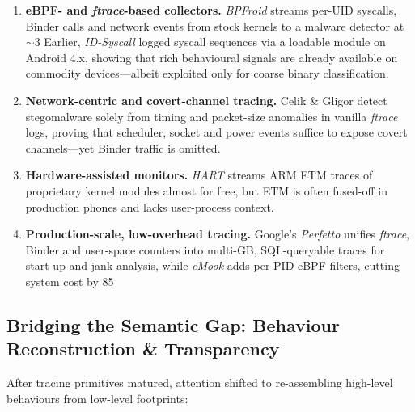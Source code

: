 \documentclass[a4paper,12pt]{report}
\begin{document}
\begin{enumerate}[label=(\alph*)]
  \item \textbf{eBPF- and \textit{ftrace}-based collectors.}
        \emph{BPFroid} streams per-UID syscalls, Binder calls and network events from stock kernels to a malware detector at $\sim$3 %
        Earlier, \emph{ID-Syscall} logged syscall sequences via a loadable module on Android 4.x, showing that rich behavioural signals are already available on commodity devices—albeit exploited only for coarse binary classification.

  \item \textbf{Network-centric and covert-channel tracing.}
        Celik \& Gligor detect stegomalware solely from timing and packet-size anomalies in vanilla \textit{ftrace} logs, proving that scheduler, socket and power events suffice to expose covert channels—yet Binder traffic is omitted.

  \item \textbf{Hardware-assisted monitors.}
        \emph{HART} streams ARM ETM traces of proprietary kernel modules almost for free, but ETM is often fused-off in production phones and lacks user-process context.

  \item \textbf{Production-scale, low-overhead tracing.}
        Google’s \emph{Perfetto} unifies \textit{ftrace}, Binder and user-space counters into multi-GB, SQL-queryable traces for start-up and jank analysis, while \emph{eMook} adds per-PID eBPF filters, cutting system cost by 85 %
\end{enumerate}

\subsection{Bridging the Semantic Gap: Behaviour Reconstruction \& Transparency}
After tracing primitives matured, attention shifted to re-assembling high-level behaviours from low-level footprints:
\end{document}
